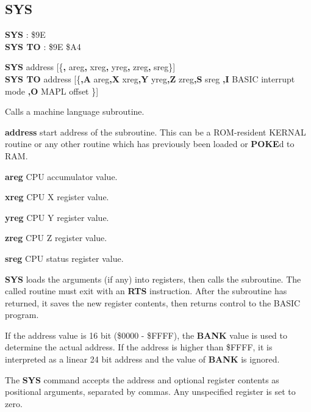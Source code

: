 
\newpage
\subsection{SYS}
\begin{description}[leftmargin=2cm,style=nextline]
\item [Token:]    {\bf SYS} : \$9E \\ {\bf SYS TO} : \$9E \$A4

\item [Format:]   {\bf SYS} address [\{{\bf,} areg{\bf,} xreg{\bf,} yreg{\bf,} zreg{\bf,} sreg\}] \\
                  {\bf SYS TO} address [\{{\bf,A} areg{\bf,X} xreg{\bf,Y} yreg{\bf,Z} zreg{\bf,S} sreg {\bf,I} BASIC interrupt mode {\bf,O} MAPL offset \}]

\item [Usage:]    Calls a machine language subroutine.

                  {\bf address} start address of the subroutine. This can be a ROM-resident KERNAL routine or any other routine which has previously been loaded or {\bf POKE}d to RAM.

                  {\bf areg} CPU accumulator value.

                  {\bf xreg} CPU X register value.

                  {\bf yreg} CPU Y register value.

                  {\bf zreg} CPU Z register value.

                  {\bf sreg} CPU status register value.

                  {\bf SYS} loads the arguments (if any) into registers, then calls the subroutine. The called routine must exit with an {\bf RTS} instruction. After the subroutine has returned, it saves the new register contents, then returns control to the BASIC program.

                  If the address value is 16 bit (\$0000 - \$FFFF), the {\bf BANK} value is used to determine the actual address. If the address is higher than \$FFFF, it is interpreted as a linear 24 bit address and the value of {\bf BANK} is ignored.

\item [SYS form:] The {\bf SYS} command accepts the address and optional register contents as positional arguments, separated by commas. Any unspecified register is set to zero.


\end{description}
